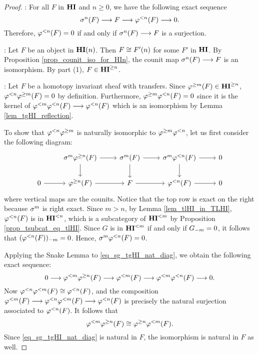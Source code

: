 \begin{proof}
 : For all $F$ in $\HI$ and $n \geq 0$, we have the 
following exact sequence
\[
\sgHI{n}(F) \to F \to \tlHI{n}(F) \to 0.
\]
Therefore, $\tlHI{n}(F) = 0$ if and only if $\sgHI{n}(F) 
\to F$ is a surjection.

 : Let $F$ be an object in $\HI(n)$. Then $F \cong
\LHI[n]{F'}$ for some $F'$ in $\HI$. By Proposition
\ref{prop_counit_iso_for_HIn}, the counit map $\sgHI{n}(F) \to F$ is
an isomorphism.  By part (1), $F \in \THI{n}$.

 : Let $F$ be a homotopy invariant sheaf with 
transfers. Since $\tgHI{m}(F) \in \THI{n}$, $\tlHI{n} \tgHI{m}(F) 
= 0$ by definition. Furthermore, $\tgHI{m}\tlHI{n}(F) = 0$ since 
it is the kernel of $\tlHI{m} \tlHI{n}(F) \to \tlHI{n}(F)$ 
which is an isomorphism by Lemma \ref{lem_tgHI_reflection}.

To show that $\tlHI{n} \tgHI{m}$ is naturally isomorphic to
$\tgHI{m} \tlHI{n}$, let us first consider the following 
diagram:
\begin{equation}\label{eq_sg_tgHI_nat_diag}
\begin{tikzcd}
{} &
\sgHI{m} \tgHI{n}(F) \arrow{r} \arrow{d} &
\sgHI{m}(F) \arrow{r} \arrow{d} &
\sgHI{m} \tlHI{n}(F) \arrow{r} \arrow{d} &
0 \\
0 \arrow{r} &
\tgHI{n}(F) \arrow{r} &
F \arrow{r} &
\tlHI{n}(F) \arrow{r}&
0
\end{tikzcd}
\end{equation}
where vertical maps are the counits. Notice that the top row is 
exact on the right because $\sgHI{m}$ is right exact.                   %
Since $m > n$, by Lemma \ref{lem_tlHI_in_TLHI},
$\tlHI{n}(F)$ is in $\TFHI{n}$, which is a subcategory of $\TFHI{m}$
by Proposition \ref{prop_tsubcat_eq_tlHI}. Since $G$ is in $\TFHI{m}$
if and only if $\RHI[m]{G} = 0$, it follows that 
$\RHI[m]{(\tlHI{n}(F))} = 0$. Hence, $\sgHI{m}\tlHI{n}(F) = 0$. 

Applying the Snake Lemma to \eqref{eq_sg_tgHI_nat_diag}, we obtain the 
following exact sequence:
\begin{equation}\label{eq_tlHI_exact_sequence}
0 \to \tlHI{m}\tgHI{n}(F) \to \tlHI{m}(F) \to \tlHI{m} \tlHI{n}(F) 
   \to 0.
\end{equation}
Now $\tlHI{n} \tlHI{m}(F) \cong \tlHI{n}(F)$, and the 
composition $\tlHI{m}(F) \to \tlHI{n}\tlHI{m} (F) \to \tlHI{n}(F)$ 
is precisely the natural surjection associated to $\tlHI{n}(F)$. It 
follows that
\[
\tlHI{m} \tgHI{n}(F) \cong \tgHI{n} \tlHI{m}(F).
\]
Since \eqref{eq_sg_tgHI_nat_diag} is natural in $F$, the isomorphism
is natural in $F$ as well.


\end{proof}
